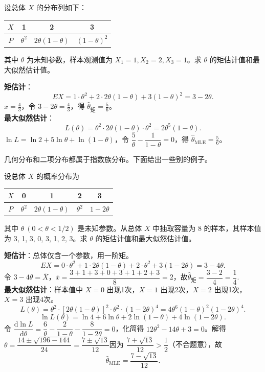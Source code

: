 ﻿\documentclass[lang=cn,11pt]{elegantbook}
\begin{document}
\begin{exercise}\label{exer:7-discrete-123}
设总体 \(X\) 的分布列如下：
\begin{center}
\begin{tabular}{c|ccc}
\(X\) & 1 & 2 & 3 \\
\hline
\(P\) & \(\theta^2\) & \(2\theta(1-\theta)\) & \((1-\theta)^2\)
\end{tabular}
\end{center}
其中 \(\theta\) 为未知参数，样本观测值为 \(X_1=1, X_2=2, X_3=1\)。求 \(\theta\) 的矩估计值和最大似然估计值。
\end{exercise}
\begin{solution}
\textbf{矩估计}：
\[
EX = 1\cdot\theta^2 + 2\cdot2\theta(1-\theta) + 3(1-\theta)^2 = 3-2\theta.
\]
\(\overline{x} = \frac{4}{3}\)，令 \(3-2\theta = \frac{4}{3}\)，得 \(\hat{\theta}_{\text{矩}} = \frac56\)。\\
\textbf{最大似然估计}：
\[
L(\theta) = \theta^2 \cdot 2\theta(1-\theta) \cdot \theta^2 = 2\theta^5(1-\theta).
\]
\(\ln L = \ln 2 + 5\ln\theta + \ln(1-\theta)\)，令 \(\dfrac{5}{\theta} - \dfrac{1}{1-\theta} = 0\)，得 \(\hat{\theta}_{\text{MLE}} = \frac56\)。
\end{solution}

\begin{note}
    几何分布和二项分布都属于指数族分布。下面给出一些别的例子。
\end{note}

\begin{exercise}\label{exer:7-discrete-4val}
设总体 \(X\) 的概率分布为
\begin{center}
\begin{tabular}{c|cccc}
\(X\) & 0 & 1 & 2 & 3 \\
\hline
\(P\) & \(\theta^2\) & \(2\theta(1-\theta)\) & \(\theta^2\) & \(1-2\theta\)
\end{tabular}
\end{center}
其中 \(\theta\ (0 < \theta < 1/2)\) 是未知参数。从总体 \(X\) 中抽取容量为 8 的样本，其样本值为 3, 1, 3, 0, 3, 1, 2, 3。求 \(\theta\) 的矩估计值和最大似然估计值。
\end{exercise}
\begin{solution}
\textbf{矩估计}：总体仅含一个参数，用一阶矩。
\[
EX = 0\cdot\theta^2 + 1\cdot2\theta(1-\theta) + 2\cdot\theta^2 + 3(1-2\theta) = 3-4\theta.
\]
令 \(3-4\theta = \overline{X}\)，\(\overline{x} = \dfrac{3+1+3+0+3+1+2+3}{8} = 2\)，故$\hat{\theta}_{\text{矩}} = \dfrac{3-2}{4} = \dfrac{1}{4}$.\\
\textbf{最大似然估计}：样本值中 \(X=0\) 出现1次，\(X=1\) 出现2次，\(X=2\) 出现1次，\(X=3\) 出现4次。
\[
L(\theta) = \theta^2\cdot[2\theta(1-\theta)]^2\cdot\theta^2\cdot(1-2\theta)^4 = 4\theta^6(1-\theta)^2(1-2\theta)^4.
\]
\[
\ln L(\theta) = \ln 4 + 6\ln\theta + 2\ln(1-\theta) + 4\ln(1-2\theta).
\]
令 \(\dfrac{\mathrm{d}\ln L}{\mathrm{d}\theta} = \dfrac{6}{\theta} - \dfrac{2}{1-\theta} - \dfrac{8}{1-2\theta} = 0\)，化简得 \(12\theta^2 - 14\theta + 3 = 0\)。解得$\theta = \dfrac{14\pm\sqrt{196-144}}{24} = \dfrac{7\pm\sqrt{13}}{12}$因为 \(\dfrac{7+\sqrt{13}}{12} > \dfrac{1}{2}\)（不合题意），故
\[
\hat{\theta}_{\text{MLE}} = \frac{7-\sqrt{13}}{12}.
\]
\end{solution}
\end{document}
